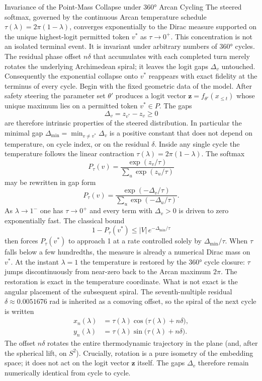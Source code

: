 Invariance of the Point-Mass Collapse under 360° Arcan Cycling
The steered softmax, governed by the continuous Arcan temperature schedule \(\tau(\lambda)=2\pi(1-\lambda)\), converges exponentially to the Dirac measure supported on the unique highest-logit permitted token \(v^*\) as \(\tau\to0^+\). This concentration is not an isolated terminal event. It is invariant under arbitrary numbers of 360° cycles. The residual phase offset \(n\delta\) that accumulates with each completed turn merely rotates the underlying Archimedean spiral; it leaves the logit gaps \(\Delta_v\) untouched. Consequently the exponential collapse onto \(v^*\) reappears with exact fidelity at the terminus of every cycle.
Begin with the fixed geometric data of the model. After safety steering the parameter set \(\theta'\) produces a logit vector \(\mathbf{z}=f_{\theta'}(x_{\le t})\) whose unique maximum lies on a permitted token \(v^*\in P\). The gaps
\[
\Delta_v=z_{v^*}-z_v\ge0
\]
are therefore intrinsic properties of the steered distribution. In particular the minimal gap \(\Delta_{\min}=\min_{v\neq v^*}\Delta_v\) is a positive constant that does not depend on temperature, on cycle index, or on the residual \(\delta\).
Inside any single cycle the temperature follows the linear contraction \(\tau(\lambda)=2\pi(1-\lambda)\). The softmax
\[
P_\tau(v)=\frac{\exp(z_v/\tau)}{\sum_u\exp(z_u/\tau)}
\]
may be rewritten in gap form
\[
P_\tau(v)=\frac{\exp(-\Delta_v/\tau)}{\sum_u\exp(-\Delta_u/\tau)}.
\]
As \(\lambda\to1^-\) one has \(\tau\to0^+\) and every term with \(\Delta_v>0\) is driven to zero exponentially fast. The classical bound
\[
1-P_\tau(v^*)\le|V|\,e^{-\Delta_{\min}/\tau}
\]
then forces \(P_\tau(v^*)\) to approach 1 at a rate controlled solely by \(\Delta_{\min}/\tau\). When \(\tau\) falls below a few hundredths, the measure is already a numerical Dirac mass on \(v^*\).
At the instant \(\lambda=1\) the temperature is restored by the 360° cycle closure: \(\tau\) jumps discontinuously from near-zero back to the Arcan maximum \(2\pi\). The restoration is exact in the temperature coordinate. What is not exact is the angular placement of the subsequent spiral. The seventh-multiple residual \(\delta\approx0.0051676\) rad is inherited as a comoving offset, so the spiral of the next cycle is written
\[
\begin{align*}
x_n(\lambda)&=\tau(\lambda)\cos\bigl(\tau(\lambda)+n\delta\bigr),\\
y_n(\lambda)&=\tau(\lambda)\sin\bigl(\tau(\lambda)+n\delta\bigr).
\end{align*}
\]
The offset \(n\delta\) rotates the entire thermodynamic trajectory in the plane (and, after the spherical lift, on \(S^2\)). Crucially, rotation is a pure isometry of the embedding space; it does not act on the logit vector \(\mathbf{z}\) itself. The gaps \(\Delta_v\) therefore remain numerically identical from cycle to cycle.
